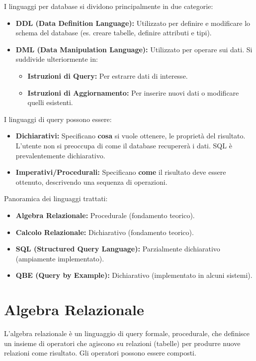 	I linguaggi per database si dividono principalmente in due categorie:
	\begin{itemize}
		\item \textbf{DDL (Data Definition Language):} Utilizzato per definire e modificare lo schema del database (es. creare tabelle, definire attributi e tipi).
		\item \textbf{DML (Data Manipulation Language):} Utilizzato per operare sui dati. Si suddivide ulteriormente in:
		\begin{itemize}
			\item \textbf{Istruzioni di Query:} Per estrarre dati di interesse.
			\item \textbf{Istruzioni di Aggiornamento:} Per inserire nuovi dati o modificare quelli esistenti.
		\end{itemize}
	\end{itemize}
	
	I linguaggi di query possono essere:
	\begin{itemize}
		\item \textbf{Dichiarativi:} Specificano \textbf{cosa} si vuole ottenere, le proprietà del risultato. L'utente non si preoccupa di come il database recupererà i dati. SQL è prevalentemente dichiarativo.
		\item \textbf{Imperativi/Procedurali:} Specificano \textbf{come} il risultato deve essere ottenuto, descrivendo una sequenza di operazioni.
	\end{itemize}
	
	Panoramica dei linguaggi trattati:
	\begin{itemize}
		\item \textbf{Algebra Relazionale:} Procedurale (fondamento teorico).
		\item \textbf{Calcolo Relazionale:} Dichiarativo (fondamento teorico).
		\item \textbf{SQL (Structured Query Language):} Parzialmente dichiarativo (ampiamente implementato).
		\item \textbf{QBE (Query by Example):} Dichiarativo (implementato in alcuni sistemi).
	\end{itemize}
	
	\section{Algebra Relazionale}
	
	L'algebra relazionale è un linguaggio di query formale, procedurale, che definisce un insieme di operatori che agiscono su relazioni (tabelle) per produrre nuove relazioni come risultato. Gli operatori possono essere composti.
	

